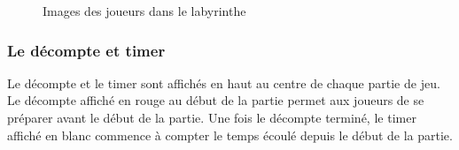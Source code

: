\begin{figure}[!htb]
    \qquad
    \qquad
    \caption{Images des joueurs dans le labyrinthe}
\end{figure}

\subsubsection*{Le décompte et timer}

Le décompte et le timer sont affichés en haut au centre de chaque partie de jeu. Le décompte affiché en rouge au début de la partie permet aux joueurs de se préparer avant le début de la partie. Une fois le décompte terminé, le timer affiché en blanc commence à compter le temps écoulé depuis le début de la partie.

